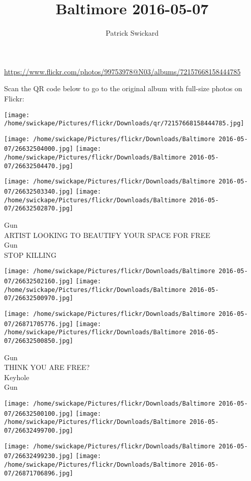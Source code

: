 \documentclass[10pt,letterpaper]{article}
\title{Baltimore 2016-05-07}
\author{Patrick Swickard}
\date{}
\begin{document}
\maketitle

\url{https://www.flickr.com/photos/99753978@N03/albums/72157668158444785}

Scan the QR code below to go to the original album with full-size photos on Flickr:

\texttt{[image: /home/swickape/Pictures/flickr/Downloads/qr/72157668158444785.jpg]}
\pagebreak

\texttt{[image: /home/swickape/Pictures/flickr/Downloads/Baltimore 2016-05-07/26632504000.jpg]}
\texttt{[image: /home/swickape/Pictures/flickr/Downloads/Baltimore 2016-05-07/26632504470.jpg]}

\texttt{[image: /home/swickape/Pictures/flickr/Downloads/Baltimore 2016-05-07/26632503340.jpg]}
\texttt{[image: /home/swickape/Pictures/flickr/Downloads/Baltimore 2016-05-07/26632502870.jpg]}

Gun\\
ARTIST LOOKING TO BEAUTIFY YOUR SPACE FOR FREE\\
Gun\\
STOP KILLING
\pagebreak

\texttt{[image: /home/swickape/Pictures/flickr/Downloads/Baltimore 2016-05-07/26632502160.jpg]}
\texttt{[image: /home/swickape/Pictures/flickr/Downloads/Baltimore 2016-05-07/26632500970.jpg]}

\texttt{[image: /home/swickape/Pictures/flickr/Downloads/Baltimore 2016-05-07/26871705776.jpg]}
\texttt{[image: /home/swickape/Pictures/flickr/Downloads/Baltimore 2016-05-07/26632500850.jpg]}

Gun\\
THINK YOU ARE FREE?\\
Keyhole\\
Gun
\pagebreak

\texttt{[image: /home/swickape/Pictures/flickr/Downloads/Baltimore 2016-05-07/26632500100.jpg]}
\texttt{[image: /home/swickape/Pictures/flickr/Downloads/Baltimore 2016-05-07/26632499700.jpg]}

\texttt{[image: /home/swickape/Pictures/flickr/Downloads/Baltimore 2016-05-07/26632499230.jpg]}
\texttt{[image: /home/swickape/Pictures/flickr/Downloads/Baltimore 2016-05-07/26871706896.jpg]}
\end{document}
